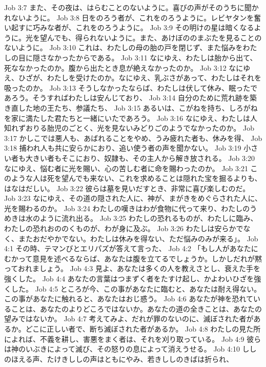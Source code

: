 Job 3:7  また、その夜は、はらむことのないように。喜びの声がそのうちに聞かれないように。
Job 3:8  日をのろう者が、これをのろうように。レビヤタンを奮い起すに巧みな者が、これをのろうように。
Job 3:9  その明けの星は暗くなるように。光を望んでも、得られないように。また、あけぼののまぶたを見ることのないように。
Job 3:10  これは、わたしの母の胎の戸を閉じず、また悩みをわたしの目に隠さなかったからである。
Job 3:11  なにゆえ、わたしは胎から出て、死ななかったのか。腹から出たとき息が絶えなかったのか。
Job 3:12  なにゆえ、ひざが、わたしを受けたのか。なにゆえ、乳ぶさがあって、わたしはそれを吸ったのか。
Job 3:13  そうしなかったならば、わたしは伏して休み、眠ったであろう。そうすればわたしは安んじており、
Job 3:14  自分のために荒れ跡を築き直した地の王たち、参議たち、
Job 3:15  あるいは、こがねを持ち、しろがねを家に満たした君たちと一緒にいたであろう。
Job 3:16  なにゆえ、わたしは人知れずおりる胎児のごとく、光を見ないみどりごのようでなかったのか。
Job 3:17  かしこでは悪人も、あばれることをやめ、うみ疲れた者も、休みを得、
Job 3:18  捕われ人も共に安らかにおり、追い使う者の声を聞かない。
Job 3:19  小さい者も大きい者もそこにおり、奴隷も、その主人から解き放される。
Job 3:20  なにゆえ、悩む者に光を賜い、心の苦しむ者に命を賜わったのか。
Job 3:21  このような人は死を望んでも来ない、これを求めることは隠れた宝を掘るよりも、はなはだしい。
Job 3:22  彼らは墓を見いだすとき、非常に喜び楽しむのだ。
Job 3:23  なにゆえ、その道の隠された人に、神が、まがきをめぐらされた人に、光を賜わるのか。
Job 3:24  わたしの嘆きはわが食物に代って来り、わたしのうめきは水のように流れ出る。
Job 3:25  わたしの恐れるものが、わたしに臨み、わたしの恐れおののくものが、わが身に及ぶ。
Job 3:26  わたしは安らかでなく、またおだやかでない。わたしは休みを得ない、ただ悩みのみが来る」。
Job 4:1  その時、テマンびとエリパズが答えて言った、
Job 4:2  「もし人があなたにむかって意見を述べるならば、あなたは腹を立てるでしょうか。しかしだれが黙っておれましょう。
Job 4:3  見よ、あなたは多くの人を教えさとし、衰えた手を強くした。
Job 4:4  あなたの言葉はつまずく者をたすけ起し、かよわいひざを強くした。
Job 4:5  ところが今、この事があなたに臨むと、あなたは耐え得ない。この事があなたに触れると、あなたはおじ惑う。
Job 4:6  あなたが神を恐れていることは、あなたのよりどころではないか。あなたの道の全きことは、あなたの望みではないか。
Job 4:7  考えてみよ、だれが罪のないのに、滅ぼされた者があるか。どこに正しい者で、断ち滅ぼされた者があるか。
Job 4:8  わたしの見た所によれば、不義を耕し、害悪をまく者は、それを刈り取っている。
Job 4:9  彼らは神のいぶきによって滅び、その怒りの息によって消えうせる。
Job 4:10  ししのほえる声、たけきししの声はともにやみ、若きししのきばは折られ、
